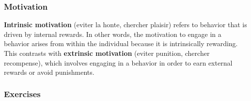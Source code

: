 \begin{figure}[H]
\centering
{}
\end{figure}

\subsubsection{Motivation}

\textbf{Intrinsic motivation} (eviter la honte, chercher plaisir) refers to behavior that is driven by internal rewards. In other words, the motivation to engage in a behavior arises from within the individual because it is intrinsically rewarding. This contrasts with \textbf{extrinsic motivation} (eviter punition, chercher recompense), which involves engaging in a behavior in order to earn external rewards or avoid punishments.

\subsubsection{Exercises}

\begin{figure}[H]
\centering
{}
\end{figure}



